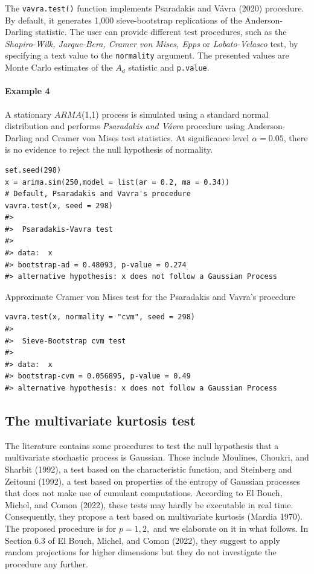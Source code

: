 The \texttt{vavra.test()} function implements Psaradakis and Vávra (2020) procedure. By default, it generates 1,000 sieve-bootstrap replications of the Anderson-Darling statistic. The user can provide different test procedures, such as the \emph{Shapiro-Wilk, Jarque-Bera, Cramer von Mises, Epps} or \emph{Lobato-Velasco} test, by specifying a text value to the \texttt{normality} argument. The presented values are Monte Carlo estimates of the \(A_d\) statistic and \texttt{p.value}.

\hypertarget{example-4}{%
\paragraph{Example 4}\label{example-4}}

A stationary \(ARMA\)(1,1) process is simulated using a standard normal distribution and performs \emph{Psaradakis and Vávra} procedure using Anderson-Darling and Cramer von Mises test statistics. At significance level \(\alpha = 0.05\), there is no evidence to reject the null hypothesis of normality.

\begin{verbatim}
set.seed(298)
x = arima.sim(250,model = list(ar = 0.2, ma = 0.34))
# Default, Psaradakis and Vavra's procedure
vavra.test(x, seed = 298)
#> 
#>  Psaradakis-Vavra test
#> 
#> data:  x
#> bootstrap-ad = 0.48093, p-value = 0.274
#> alternative hypothesis: x does not follow a Gaussian Process
\end{verbatim}

Approximate Cramer von Mises test for the Psaradakis and Vavra's procedure

\begin{verbatim}
vavra.test(x, normality = "cvm", seed = 298)
#> 
#>  Sieve-Bootstrap cvm test
#> 
#> data:  x
#> bootstrap-cvm = 0.056895, p-value = 0.49
#> alternative hypothesis: x does not follow a Gaussian Process
\end{verbatim}

\hypertarget{the-multivariate-kurtosis-test}{%
\subsection{The multivariate kurtosis test}\label{the-multivariate-kurtosis-test}}

The literature contains some procedures to test the null hypothesis that a multivariate stochastic process is Gaussian. Those include Moulines, Choukri, and Sharbit (1992), a test based on the characteristic function, and Steinberg and Zeitouni (1992), a test based on properties of the entropy of Gaussian processes that does not make use of cumulant computations. According to El Bouch, Michel, and Comon (2022), these tests may hardly be executable in real time. Consequently, they propose a test based on multivariate kurtosis (Mardia 1970). The proposed procedure is for \(p=1,2,\) and we elaborate on it in what follows. In Section 6.3 of El Bouch, Michel, and Comon (2022), they suggest to apply random projections for higher dimensions but they do not investigate the procedure any further.

